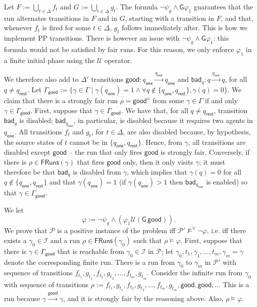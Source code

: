 \documentclass[10pt,a4paper]{article}
\newcommand{\set}[1]{\{#1\}}
\newcommand{\deff}{:=}
\newcommand{\fairrunsfrom}[1]{\mathsf{FRuns}(#1)}
\newcommand{\config}{\gamma}
\newcommand{\configs}{\Gamma}
\newcommand{\initialconfigs}{\mathcal{I}}
\newcommand{\step}[1]{\xrightarrow{#1}}
\newcommand{\run}{\rho}
\newcommand{\transitions}{\Delta}
\newcommand*{\atrans}{t}
\newcommand{\PP}{\mathcal{P}}                  %
\newcommand{\trans}[1]{\xrightarrow{#1}}       %
\newcommand{\initial}{\mathcal{I}}   %
\newcommand{\ltlglobally}{\mathsf{G}}
\newcommand{\ltluntil}{\mathbin \mathcal{U}}
\newcommand{\stateone}{q_{\mathsf{one}}}
\newcommand{\staterest}{q_{\mathsf{rest}}}
\newcommand{\tgood}{\mathsf{good}}
\newcommand{\tbad}[1]{\mathsf{bad}_{#1}}
\newcommand{\goodconfigs}{\configs_{\mathsf{good}}}
\begin{document}
\begin{appendixproof}
	Let \(F \deff \bigcup_{t \in \transitions} f_t\) and \(G \deff \bigcup_{t \in \transitions} g_t\).
	The formula \(\neg \psi_g \land \ltlglobally \varphi_1\) guarantees that the run alternates transitions in \(F\) and in \(G\), starting with a transition in \(F\), and that, whenever \(f_t\) is fired for some \(t \in \transitions\), \(g_t\) follows immediately after.
	This is how we implement PP transitions.
	There is however an issue with \(\neg \psi_g \land \ltlglobally \varphi_1\): this formula would not be satisfied by fair runs.
	For this reason, we only enforce \(\varphi_1\) in a finite initial phase using the \(\ltluntil\) operator.

	We therefore also add to \(\transitions'\) transitions \(\tgood: \stateone \trans{\staterest} \stateone\) and \(\tbad{q}: q \trans{\stateone} q\), for all \(q \neq \staterest\).
	Let \(\goodconfigs \deff \set{\config \in \configs \mid \config(\stateone) =1 \land \forall q \notin \set{\stateone, \staterest}, \config(q) = 0}\).
	We claim that there is a strongly fair run \(\run=\tgood^\omega\) from some \(\config \in \configs\) if and only \(\config \in \goodconfigs\).
	First, suppose that \(\config \in \goodconfigs\).
	We have that, for all \(q \ne \staterest\), transition \(\tbad{q}\) is disabled; \(\tbad{\stateone}\), in particular, is disabled because it requires two agents in \(\stateone\).
	All transitions \(f_t\) and \(g_t\), for \(t \in \transitions\), are also disabled because, by hypothesis, the source states of \(t\) cannot be in \(\set{\stateone, \staterest}\).
	Hence, from \(\config\), all transitions are disabled except \(\tgood\) -- the run that only fires \(\tgood\) is strongly fair.
	Conversely, if there is \(\run \in \fairrunsfrom{\config}\) that fires \(\tgood\) only, then it only visits \(\config\); it must therefore be that \(\tbad{q}\) is disabled from \(\config\), which implies that \(\config(q) = 0\) for all \(q \notin \set{\stateone, \staterest}\) and that \(\config(\stateone) =1\) (if \(\config(\stateone) > 1\) then \(\tbad{\stateone}\) is enabled) so that \(\config \in \goodconfigs\).

	We let \[\varphi \deff \neg \psi_g \land (\varphi_1 \ltluntil (\ltlglobally \, \tgood)).
	\] We prove that \(\PP\) is a positive instance of the problem
	iff \(\PP' \nvDash^{\forall} \neg \varphi\),
	i.e. iff there exists a \(\config_0 \in \initial\) and a run \(\run \in \fairrunsfrom{\config_0}\) such that \(\run \models \varphi\).
	First, suppose that there is \(\config \in \goodconfigs\) that is reachable from \(\config_0 \in \initialconfigs\) in \(\PP\); let \(\config_0, \atrans_1, \config_1,\dots, \atrans_m,\config_m = \config\) denote the corresponding finite run.
	There is a run from \(\config_0\) to \(\config_m\) in \(\PP'\) with sequence of transitions \(f_{\atrans_1}, g_{\atrans_1}, f_{\atrans_2}, g_{\atrans_2}, \dots, f_{\atrans_m}, g_{\atrans_m}\).
	Consider the infinite run from \(\config_0\) with sequence of transitions \(\run \deff f_{\atrans_1}, g_{\atrans_1}, f_{\atrans_2}, g_{\atrans_2}, \dots, f_{\atrans_m}, g_{\atrans_m}, \tgood, \tgood,\dots\) This is a run because \(\config \step{\tgood} \config\), and it is strongly fair by the reasoning above.
	Also, \(\run \models \varphi\).


\end{appendixproof}
\end{document}
